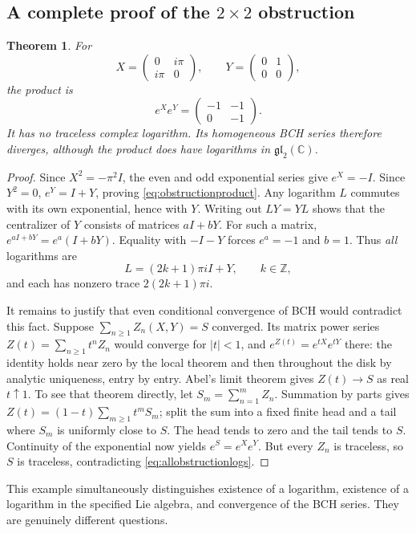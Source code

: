 \documentclass[11pt]{article}
\numberwithin{equation}{section}
\newtheorem{theorem}{Theorem}[section]
\theoremstyle{definition}
\theoremstyle{remark}
\newcommand{\C}{\mathbb{C}}
\newcommand{\Z}{\mathbb{Z}}
\begin{document}
\subsection{A complete proof of the \texorpdfstring{$2\times2$}{2 by 2} obstruction}
\begin{theorem}\label{thm:obstruction}
For
\begin{equation}\label{eq:obstructionXY}
 X=\begin{pmatrix}0&i\pi\\i\pi&0\end{pmatrix},\qquad
 Y=\begin{pmatrix}0&1\\0&0\end{pmatrix},
\end{equation}
the product is
\begin{equation}\label{eq:obstructionproduct}
 e^Xe^Y=\begin{pmatrix}-1&-1\\0&-1\end{pmatrix}.
\end{equation}
It has no traceless complex logarithm. Its homogeneous BCH series
therefore diverges, although the product does have logarithms in
$\mathfrak{gl}_2(\C)$.
\end{theorem}
\begin{proof}
Since $X^2=-\pi^2I$, the even and odd exponential series give
$e^X=-I$. Since $Y^2=0$, $e^Y=I+Y$, proving
\eqref{eq:obstructionproduct}.
Any logarithm $L$ commutes with its own exponential, hence with $Y$.
Writing out $LY=YL$ shows that the centralizer of $Y$ consists of
matrices $aI+bY$. For such a matrix,
$e^{aI+bY}=e^a(I+bY)$. Equality with $-I-Y$ forces
$e^a=-1$ and $b=1$. Thus \emph{all} logarithms are
\begin{equation}\label{eq:allobstructionlogs}
 L=(2k+1)\pi iI+Y,\qquad k\in\Z,
\end{equation}
and each has nonzero trace $2(2k+1)\pi i$.

It remains to justify that even conditional convergence of BCH would
contradict this fact. Suppose $\sum_{n\geq1}Z_n(X,Y)=S$ converged.
Its matrix power series $Z(t)=\sum_{n\geq1}t^nZ_n$ would converge
for $|t|<1$, and $e^{Z(t)}=e^{tX}e^{tY}$ there: the identity holds
near zero by the local theorem and then throughout the disk by
analytic uniqueness, entry by entry. Abel's limit theorem gives
$Z(t)\to S$ as real $t\uparrow1$. To see that theorem directly,
let $S_m=\sum_{n=1}^m Z_n$. Summation by parts gives
$Z(t)=(1-t)\sum_{m\geq1}t^m S_m$; split the sum into a fixed finite
head and a tail where $S_m$ is uniformly close to $S$. The head tends
to zero and the tail tends to $S$. Continuity of the exponential
now yields $e^S=e^Xe^Y$. But every $Z_n$ is traceless, so $S$ is
traceless, contradicting \eqref{eq:allobstructionlogs}.
\end{proof}
This example simultaneously distinguishes existence of a logarithm,
existence of a logarithm in the specified Lie algebra, and convergence
of the BCH series. They are genuinely different questions.
\end{document}
